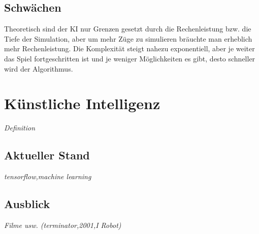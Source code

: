 \documentclass[12pt,a4paper,ngerman]{article}
\begin{document}
	\subsection{Schwächen}
	Theoretisch sind der KI nur Grenzen gesetzt durch die Rechenleistung bzw. die Tiefe der Simulation, aber um mehr Züge zu simulieren bräuchte man erheblich mehr Rechenleistung. Die Komplexität steigt nahezu exponentiell, aber je weiter das Spiel fortgeschritten ist und je weniger Möglichkeiten es gibt, desto schneller wird der Algorithmus.
	\section{Künstliche Intelligenz}
	\textit{Definition}
	\subsection{Aktueller Stand}
	\textit{tensorflow,machine learning}
	\subsection{Ausblick}
	\textit{Filme usw. (terminator,2001,I Robot)}
	
\end{document}
